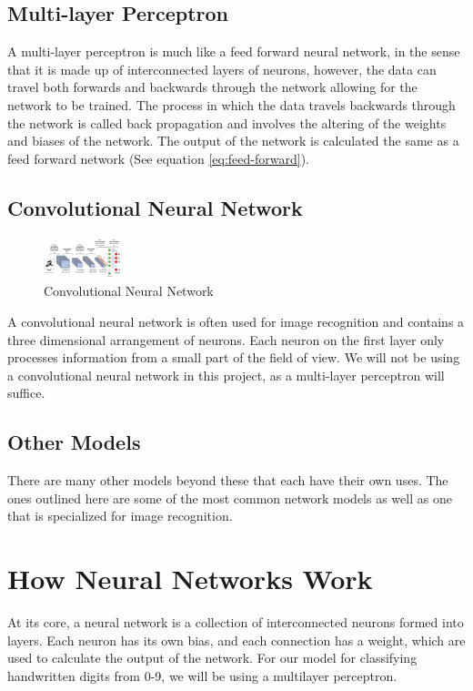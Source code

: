 \documentclass[a1,portrait]{a1poster}
\begin{document}
\begin{multicols}{2}
\subsection*{Multi-layer Perceptron}
A multi-layer perceptron is much like a feed forward neural network, in the sense that it is made up of interconnected layers of neurons, however, the data can travel both forwards and backwards through the network allowing for the network to be trained. The process in which the data travels backwards through the network is called back propagation and involves the altering of the weights and biases of the network. The output of the network is calculated the same as a feed forward network (See equation \ref{eq:feed-forward}).

\subsection*{Convolutional Neural Network}
\begin{figure}
    \centering
    \includegraphics[width=0.2\textwidth]{assets/convolutional2.jpeg}
    \caption{Convolutional Neural Network}
    \label{fig:convolutional}
\end{figure}
A convolutional neural network is often used for image recognition and contains a three dimensional arrangement of neurons. Each neuron on the first layer only processes information from a small part of the field of view. We will not be using a convolutional neural network in this project, as a multi-layer perceptron will suffice.
\subsection*{Other Models}
There are many other models beyond these that each have their own uses. The ones outlined here are some of the most common network models as well as one that is specialized for image recognition.

\section*{How Neural Networks Work}
At its core, a neural network is a collection of interconnected neurons formed into layers. Each neuron has its own bias, and each connection has a weight, which are used to calculate the output of the network. For our model for classifying handwritten digits from 0-9, we will be using a multilayer perceptron.

\end{multicols}
\end{document}
